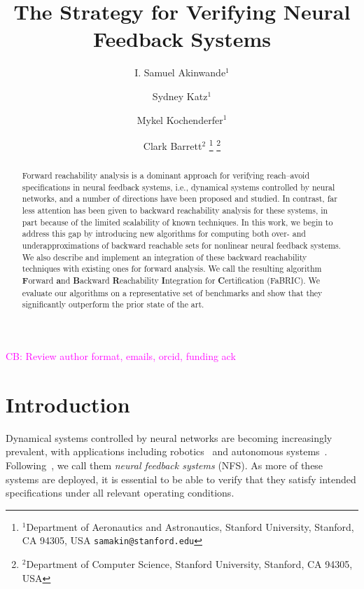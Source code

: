 \documentclass[letterpaper, 10 pt, conference]{ieeeconf}  %
\title{\LARGE \bf
The \fab Strategy for Verifying Neural Feedback Systems
}
\author{I. Samuel Akinwande$^{1}$ \and Sydney Katz$^{1}$ \and Mykel Kochenderfer$^{1}$ \and Clark Barrett$^{2}$%
\thanks{$^{1}$Department of Aeronautics and Astronautics, Stanford University, Stanford, CA 94305, USA
        {\tt\small samakin@stanford.edu}}%
\thanks{$^{2}$Department of Computer Science, Stanford University, Stanford, CA 94305, USA
        }%
}
\newcommand{\cb}[1]{\noindent\textcolor{magenta}{\newline CB: #1}}
\newcommand{\cb}[1]{}
\begin{document}
\maketitle
\thispagestyle{empty}
\pagestyle{empty}

\begin{abstract}
Forward reachability analysis is a dominant approach for verifying
reach--avoid specifications in neural feedback systems, i.e., dynamical systems
controlled by neural networks, and a number of directions have been proposed and
studied.  In contrast, far less attention has been given to backward
reachability analysis for these systems, in part because of the limited
scalability of known techniques. In this work, we begin to address this gap by
introducing new algorithms for computing both over- and underapproximations of
backward reachable sets for
nonlinear neural feedback systems. We also describe and implement an integration of these backward
reachability techniques with existing ones for forward analysis.  We call the
resulting algorithm
\textbf{F}orward \textbf{a}nd \textbf{B}ackward \textbf{R}eachability \textbf{I}ntegration for \textbf{C}ertification (FaBRIC). We evaluate our
algorithms on a representative set of benchmarks and show that they
significantly outperform the prior state of the art.
\end{abstract}

\cb{Review author format, emails, orcid, funding ack}

\section{Introduction}
Dynamical systems controlled by neural networks are becoming increasingly
prevalent, with applications including robotics~\cite{csomay2024robust} and autonomous
systems~\cite{kaufmann2023champion}. Following~\cite{akinwande2025verifying}, we call them
\emph{neural feedback systems} (NFS). As more of these systems are
deployed, it is essential to be able to verify that
they satisfy intended specifications under all relevant operating conditions. 
\end{document}
